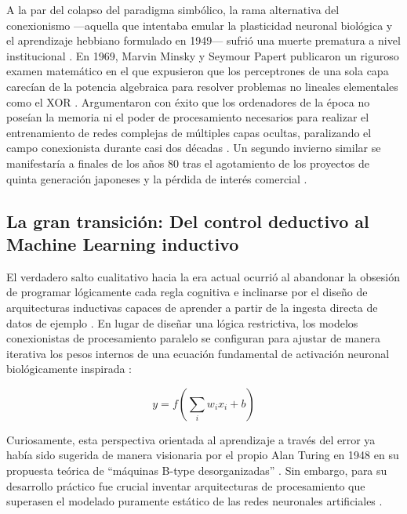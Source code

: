 \documentclass[12pt, a4paper]{article}
\begin{document}
A la par del colapso del paradigma simbólico, la rama alternativa del conexionismo ---aquella que intentaba emular la plasticidad neuronal biológica y el aprendizaje hebbiano formulado en 1949--- sufrió una muerte prematura a nivel institucional \parencite{haenlein2019brief}. En 1969, Marvin Minsky y Seymour Papert publicaron un riguroso examen matemático en el que expusieron que los perceptrones de una sola capa carecían de la potencia algebraica para resolver problemas no lineales elementales como el XOR \parencite{haenlein2019brief}. Argumentaron con éxito que los ordenadores de la época no poseían la memoria ni el poder de procesamiento necesarios para realizar el entrenamiento de redes complejas de múltiples capas ocultas, paralizando el campo conexionista durante casi dos décadas \parencite{haenlein2019brief}. Un segundo invierno similar se manifestaría a finales de los años 80 tras el agotamiento de los proyectos de quinta generación japoneses y la pérdida de interés comercial \parencite{haenlein2019brief}.

\subsection{La gran transición: Del control deductivo al Machine Learning inductivo}

El verdadero salto cualitativo hacia la era actual ocurrió al abandonar la obsesión de programar lógicamente cada regla cognitiva e inclinarse por el diseño de arquitecturas inductivas capaces de aprender a partir de la ingesta directa de datos de ejemplo \parencite{haenlein2019brief, zhang2023turing}. En lugar de diseñar una lógica restrictiva, los modelos conexionistas de procesamiento paralelo se configuran para ajustar de manera iterativa los pesos internos de una ecuación fundamental de activación neuronal biológicamente inspirada \parencite{zhang2023turing}:

\begin{equation}
y = f \left( \sum_{i} w_i x_i + b \right)
\end{equation}

Curiosamente, esta perspectiva orientada al aprendizaje a través del error ya había sido sugerida de manera visionaria por el propio Alan Turing en 1948 en su propuesta teórica de ``máquinas B-type desorganizadas'' \parencite{zhang2023turing}. Sin embargo, para su desarrollo práctico fue crucial inventar arquitecturas de procesamiento que superasen el modelado puramente estático de las redes neuronales artificiales \parencite{zhang2023turing}.
\end{document}
